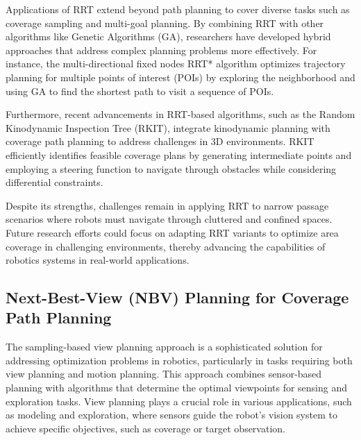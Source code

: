 \vspace*{6mm}

Applications of RRT extend beyond path planning to cover diverse tasks such as coverage sampling and multi-goal planning. By combining RRT with other algorithms like Genetic Algorithms (GA), researchers have developed hybrid approaches that address complex planning problems more effectively. For instance, the multi-directional fixed nodes RRT* algorithm optimizes trajectory planning for multiple points of interest (POIs) by exploring the neighborhood and using GA to find the shortest path to visit a sequence of POIs.

\vspace*{6mm}

Furthermore, recent advancements in RRT-based algorithms, such as the Random Kinodynamic Inspection Tree (RKIT), integrate kinodynamic planning with coverage path planning to address challenges in 3D environments. RKIT efficiently identifies feasible coverage plans by generating intermediate points and employing a steering function to navigate through obstacles while considering differential constraints.

\vspace*{6mm}

Despite its strengths, challenges remain in applying RRT to narrow passage scenarios where robots must navigate through cluttered and confined spaces. Future research efforts could focus on adapting RRT variants to optimize area coverage in challenging environments, thereby advancing the capabilities of robotics systems in real-world applications.


\subsection{Next-Best-View (NBV) Planning for Coverage Path Planning}

The sampling-based view planning approach is a sophisticated solution for addressing optimization problems in robotics, particularly in tasks requiring both view planning and motion planning. This approach combines sensor-based planning with algorithms that determine the optimal viewpoints for sensing and exploration tasks. View planning plays a crucial role in various applications, such as modeling and exploration, where sensors guide the robot's vision system to achieve specific objectives, such as coverage or target observation.

\vspace*{6mm}

